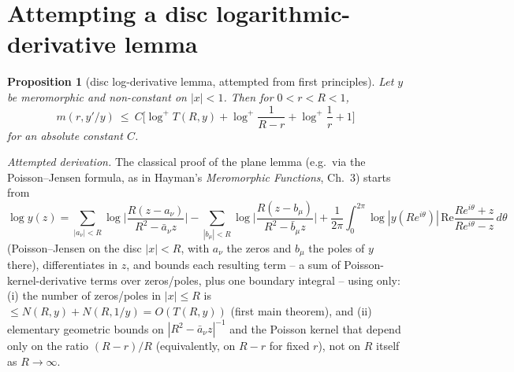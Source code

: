 \documentclass[11pt]{article}
\newtheorem{proposition}[theorem]{Proposition}
\theoremstyle{remark}
\begin{document}
\section{Attempting a disc logarithmic-derivative lemma}\label{sec:logderiv}

\begin{proposition}[disc log-derivative lemma, attempted from first principles]\label{prop:disclogderiv}
Let $y$ be meromorphic and non-constant on $|x|<1$. Then for $0<r<R<1$,
\[
m(r,y'/y)\ \le\ C\Big[\log^+T(R,y)+\log^+\frac1{R-r}+\log^+\frac1r+1\Big]
\]
for an absolute constant $C$.
\end{proposition}

\emph{Attempted derivation.} The classical proof of the plane lemma (e.g.\ via the Poisson--Jensen
formula, as in Hayman's \emph{Meromorphic Functions}, Ch.\ 3) starts from
\[
\log y(z)=\sum_{|a_\nu|<R}\log\Big|\frac{R(z-a_\nu)}{R^2-\bar a_\nu z}\Big|-\sum_{|b_\mu|<R}\log\Big|
\frac{R(z-b_\mu)}{R^2-\bar b_\mu z}\Big|+\frac1{2\pi}\int_0^{2\pi}\log|y(Re^{i\theta})|\,
\mathrm{Re}\frac{Re^{i\theta}+z}{Re^{i\theta}-z}\,d\theta
\]
(Poisson--Jensen on the disc $|x|<R$, with $a_\nu$ the zeros and $b_\mu$ the poles of $y$ there),
differentiates in $z$, and bounds each resulting term -- a sum of Poisson-kernel-derivative terms
over zeros/poles, plus one boundary integral -- using only: (i) the number of zeros/poles in
$|x|\le R$ is $\le N(R,y)+N(R,1/y)=O(T(R,y))$ (first main theorem), and (ii) elementary geometric
bounds on $|R^2-\bar a_\nu z|^{-1}$ and the Poisson kernel that depend only on the ratio
$(R-r)/R$ (equivalently, on $R-r$ for fixed $r$), not on $R$ itself as $R\to\infty$.
\end{document}
